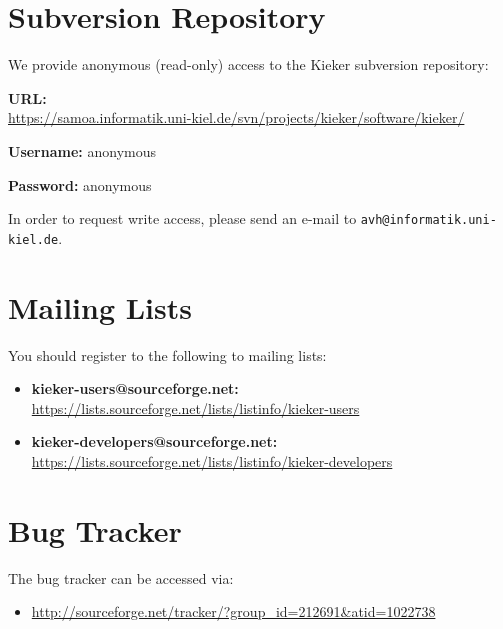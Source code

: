 \section{Subversion Repository}

We provide anonymous (read-only) access to the Kieker subversion repository:

\begin{compactitem}
\item \textbf{URL:}\\ \url{https://samoa.informatik.uni-kiel.de/svn/projects/kieker/software/kieker/}
\item \textbf{Username:} anonymous
\item \textbf{Password:} anonymous
\end{compactitem}

\medskip

\noindent In order to request write access, please send an e-mail to \texttt{avh@informatik.uni-kiel.de}.

\section{Mailing Lists}

You should register to the following to mailing lists:

\begin{itemize}
\item \textbf{kieker-users@sourceforge.net:}\\ \url{https://lists.sourceforge.net/lists/listinfo/kieker-users}
\item \textbf{kieker-developers@sourceforge.net:}\\ \url{https://lists.sourceforge.net/lists/listinfo/kieker-developers}
\end{itemize}


\section{Bug Tracker}

The bug tracker can be accessed via: 

\begin{itemize}
\item[] \url{http://sourceforge.net/tracker/?group_id=212691&atid=1022738}
\end{itemize}


